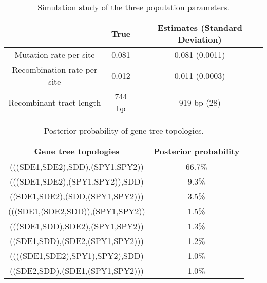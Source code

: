 \documentclass[english]{article}
\providecommand{\tabularnewline}{\\}
\begin{document}
\begin{table}
\caption{\label{tab:sim-three-population-parameters}
Simulation study of the three population parameters.}
\noindent \begin{centering}
\begin{tabular}{ccc}
 & True & Estimates (Standard Deviation)\tabularnewline
\hline
Mutation rate per site & 0.081 & 0.081 (0.0011)\tabularnewline
Recombination rate per site & 0.012 & 0.011 (0.0003)\tabularnewline
Recombinant tract length & 744 bp & 919 bp (28)\tabularnewline
\end{tabular}
\par\end{centering}
\end{table}
\clearpage{}

\begin{table}
\caption{\label{tab:Gene-tree-topologies}Posterior probability of gene tree
topologies.}
\begin{tabular}{|c|c|}
\hline 
Gene tree topologies & Posterior probability\tabularnewline
\hline
\hline 
(((SDE1,SDE2),SDD),(SPY1,SPY2)) & 66.7\%\tabularnewline
\hline 
(((SDE1,SDE2),(SPY1,SPY2)),SDD) & 9.3\%\tabularnewline
\hline 
((SDE1,SDE2),(SDD,(SPY1,SPY2))) & 3.5\%\tabularnewline
\hline 
(((SDE1,(SDE2,SDD)),(SPY1,SPY2)) & 1.5\%\tabularnewline
\hline 
(((SDE1,SDD),SDE2),(SPY1,SPY2)) & 1.3\%\tabularnewline
\hline 
((SDE1,SDD),(SDE2,(SPY1,SPY2))) & 1.2\%\tabularnewline
\hline 
((((SDE1,SDE2),SPY1),SPY2),SDD) & 1.0\%\tabularnewline
\hline 
((SDE2,SDD),(SDE1,(SPY1,SPY2))) & 1.0\%\tabularnewline
\hline
\end{tabular}
\end{table}
\clearpage{}
\end{document}
